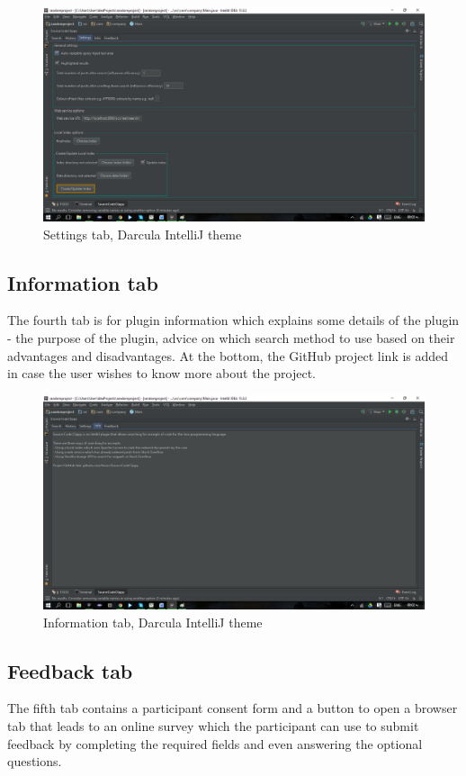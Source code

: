 \documentclass{l4proj}
\begin{document}
\begin{figure}[H]
\includegraphics[scale=0.4]{tab-settings}
\centering
\caption{Settings tab, Darcula IntelliJ theme}
\label{fig:settings-tab}
\end{figure}

\subsection{Information tab}
The fourth tab is for plugin information which explains some details of the plugin - the purpose of the plugin, advice on which search method to use based on their advantages and disadvantages. At the bottom, the GitHub project link is added in case the user wishes to know more about the project.

\begin{figure}[H]
\includegraphics[scale=0.4]{tab-info}
\centering
\caption{Information tab, Darcula IntelliJ theme}
\label{fig:info-tab}
\end{figure}

\subsection{Feedback tab}
The fifth tab contains a participant consent form and a button to open a browser tab that leads to an online survey which the participant can use to submit feedback by completing the required fields and even answering the optional questions.
\end{document}
